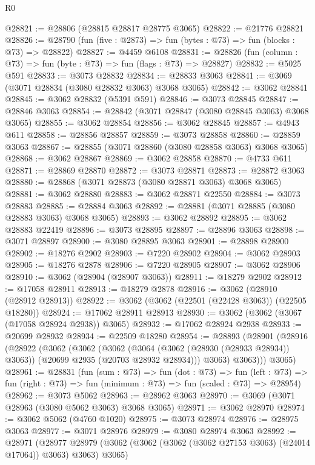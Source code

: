 \begin{lexlean}{R0}
\begin{coremodule}
@28821 := @28806 (@28815 @28817 @28775 @3065)
@28822 := @21776 @28821
@28826 := @28790 (fun (five : @2873) => fun (bytes : @73) => fun (blocks : @73) => @28822)
@28827 := @4459 @6108
@28831 := @28826 (fun (column : @73) => fun (byte : @73) => fun (flags : @73) => @28827)
@28832 := @5025 @591
@28833 := @3073 @28832
@28834 := @28833 @3063
@28841 := @3069 (@3071 @28834 (@3080 @28832 @3063) @3068 @3065)
@28842 := @3062 @28841
@28845 := @3062 @28832 (@5391 @591)
@28846 := @3073 @28845
@28847 := @28846 @3063
@28854 := @28842 (@3071 @28847 (@3080 @28845 @3063) @3068 @3065)
@28855 := @3062 @28854
@28856 := @3062 @28845
@28857 := @4943 @611
@28858 := @28856 @28857
@28859 := @3073 @28858
@28860 := @28859 @3063
@28867 := @28855 (@3071 @28860 (@3080 @28858 @3063) @3068 @3065)
@28868 := @3062 @28867
@28869 := @3062 @28858
@28870 := @4733 @611
@28871 := @28869 @28870
@28872 := @3073 @28871
@28873 := @28872 @3063
@28880 := @28868 (@3071 @28873 (@3080 @28871 @3063) @3068 @3065)
@28881 := @3062 @28880
@28883 := @3062 @28871 @22550
@28884 := @3073 @28883
@28885 := @28884 @3063
@28892 := @28881 (@3071 @28885 (@3080 @28883 @3063) @3068 @3065)
@28893 := @3062 @28892
@28895 := @3062 @28883 @22419
@28896 := @3073 @28895
@28897 := @28896 @3063
@28898 := @3071 @28897
@28900 := @3080 @28895 @3063
@28901 := @28898 @28900
@28902 := @18276 @2902
@28903 := @7220 @28902
@28904 := @3062 @28903
@28905 := @18276 @2878
@28906 := @7220 @28905
@28907 := @3062 @28906
@28910 := @3062 (@28904 (@28907 @3063))
@28911 := @18279 @2902
@28912 := @17058 @28911
@28913 := @18279 @2878
@28916 := @3062 (@28910 (@28912 @28913))
@28922 := @3062 (@3062 (@22501 (@22428 @3063)) (@22505 @18280))
@28924 := @17062 @28911 @28913
@28930 := @3062 (@3062 (@3067 (@17058 @28924 @2938)) @3065)
@28932 := @17062 @28924 @2938
@28933 := @20699 @28932
@28934 := @22509 @18280
@28954 := @28893
    (@28901
      (@28916
        (@28922
          (@3062
            (@3062
              (@3062
                (@3064 (@3062 (@28930 (@28933 @28934)) @3063))
                (@20699 @2935 (@20703 @28932 @28934)))
              @3063)
            @3063)))
      @3065)
@28961 := @28831
    (fun (sum : @73) =>
    fun (dot : @73) =>
    fun (left : @73) => fun (right : @73) => fun (minimum : @73) => fun (scaled : @73) => @28954)
@28962 := @3073 @5062
@28963 := @28962 @3063
@28970 := @3069 (@3071 @28963 (@3080 @5062 @3063) @3068 @3065)
@28971 := @3062 @28970
@28974 := @3062 @5062 (@4760 @1020)
@28975 := @3073 @28974
@28976 := @28975 @3063
@28977 := @3071 @28976
@28979 := @3080 @28974 @3063
@28992 := @28971
    (@28977 @28979 (@3062 (@3062 (@3062 (@3062 @27153 @3063) (@24014 @17064)) @3063) @3063) @3065)

\end{coremodule}
\end{lexlean}
